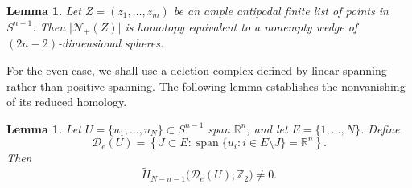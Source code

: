 \documentclass[12pt,reqno]{amsart}
\numberwithin{equation}{section}
\newtheorem{lemma}[theorem]{Lemma}
\theoremstyle{remark}
\DeclareMathOperator{\spanop}{span}
\newcommand{\R}{\mathbb R}
\newcommand{\Ncal}{\mathcal N}
\newcommand{\Dcal}{\mathcal D}
\begin{document}
\begin{lemma}\label{thm:closed-hemisphere-topology}
	Let \(Z=(z_1,\ldots,z_m)\) be an ample antipodal finite list of points
	in \(S^{n-1}\). Then 
	\(\lvert\Ncal_+(Z)\rvert\) is homotopy equivalent to a nonempty wedge
	of \((2n-2)\)-dimensional spheres.
\end{lemma}

For the even case, we shall use a deletion complex defined by
linear spanning rather than positive spanning. The following
lemma establishes the nonvanishing of its reduced homology.

\begin{lemma}\label{lem:even-deletion-homology}
	Let \(U=\{u_1,\ldots,u_N\}\subset S^{n-1}\) span \(\R^n\), and let
	\(E=\{1,\ldots,N\}\). Define
	\begin{equation}\label{eq:even-deletion-complex}
		\Dcal_e(U)
		=
		\left\{
		J\subset E:
		\spanop\{u_i:i\in E\setminus J\}=\R^n
		\right\}.
	\end{equation}
	Then
	\begin{equation}\label{eq:even-deletion-homology}
		\widetilde H_{N-n-1}
		\bigl(\Dcal_e(U);\mathbb Z_2\bigr)\neq0.
	\end{equation}
\end{lemma}
\end{document}
